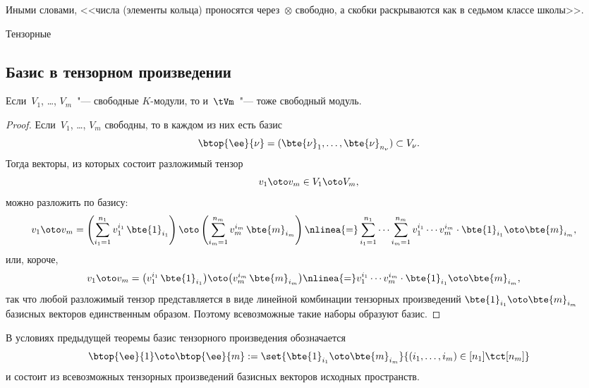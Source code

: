 Иными словами, <<числа (элементы кольца) проносятся через~$\otimes$ свободно, а скобки раскрываются как в седьмом классе школы>>.


\begin{remark}
	Тензорные 
\end{remark}


\subsection{Базис в тензорном произведении}

\begin{lemma}
	Если~$V_1$, \dots, $V_m$~"--- свободные $K$-модули, то и~$\tVm$~"--- тоже свободный модуль.
\end{lemma}
\begin{proof}
	Если~$V_1$, \dots, $V_m$ свободны, то в каждом из них есть базис
	\[
		\btop{\ee}{\nu} =
		(\bte{\nu}_1, \dots, \bte{\nu}_{n_\nu})
		\subset V_\nu
		.
	\]
	Тогда векторы, из которых состоит разложимый тензор
	\[
		v_1 \oto v_m \in V_1 \oto V_m
		,
	\]
	можно разложить по базису:
	\begin{align*}
		v_1 \oto v_m &=
		\left( 
			\sum_{i_1 = 1}^{n_1}
				v_1^{i_1}
				\,
				\bte{1}_{i_1}
		\right)
		\oto
		\left( 
			\sum_{i_m = 1}^{n_m}
				v_m^{i_m}
				\,
				\bte{m}_{i_m}
		\right)
		\nlinea{=}
		\sum_{i_1 = 1}^{n_1}
		\cdots
		\sum_{i_m = 1}^{n_m}
			v_1^{i_1}
			\cdots
			v_m^{i_m}
			\cdot
			\bte{1}_{i_1}
			\oto
			\bte{m}_{i_m}
		,
	\end{align*}
	или, короче,
	\begin{align*}
		v_1 \oto v_m &=
		\bigl( 
			v_1^{i_1}
			\,
			\bte{1}_{i_1}
		\bigr)
		\oto
		\bigl( 
			v_m^{i_m}
			\,
			\bte{m}_{i_m}
		\bigr)
		\nlinea{=}
		v_1^{i_1}
		\cdots
		v_m^{i_m}
		\cdot
		\bte{1}_{i_1}
		\oto
		\bte{m}_{i_m}
		,
	\end{align*}
	так что любой разложимый тензор представляется в виде линейной комбинации тензорных произведений
	$\bte{1}_{i_1}
		\oto
	\bte{m}_{i_m}$
	базисных векторов единственным образом. Поэтому всевозможные такие наборы образуют базис.%
\end{proof}

\begin{definition}
	В условиях предыдущей теоремы базис тензорного произведения обозначается
	\[
		\btop{\ee}{1}
		\oto
		\btop{\ee}{m}
		:=
		\set{
			\bte{1}_{i_1} \oto
			\bte{m}_{i_m}
		}{
			(i_1, \dots, i_m) \in [n_1] \tct [n_m]
		}
	\]
	и состоит из всевозможных тензорных произведений базисных векторов исходных пространств.
\end{definition}

